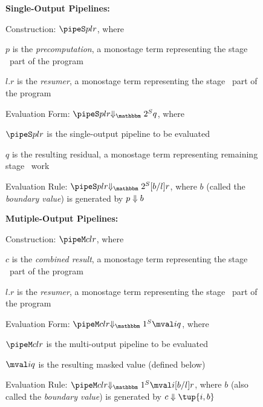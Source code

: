 \begin{figure*}
\begin{abstrsyn}

\textbf{Single-Output Pipelines:}

\hspace{2em} Construction: $\pipeS p l r$, where 
	
	\hspace{4em} $p$ is the {\em precomputation}, a monostage term representing the stage \bbone\ part of the program
	
	\hspace{4em} $l.r$ is the {\em resumer}, a monostage term representing the stage \bbtwo\ part of the program

\hspace{2em} Evaluation Form: $\sepredtwo {\pipeS p l r} q$, where 
	
	\hspace{4em} $\pipeS p l r$ is the single-output pipeline to be evaluated 
	
	\hspace{4em} $q$ is the resulting residual, a monostage term representing remaining stage \bbtwo\ work

\hspace{2em} Evaluation Rule: $\sepredtwo {\pipeS p l r} {[b/l]r}$, where $b$ (called the {\em boundary value}) is generated by ${p} \Downarrow {b}$

\textbf{Mutiple-Output Pipelines:}

\hspace{2em} Construction: $\pipeM c l r$, where 
	
	\hspace{4em} $c$ is the {\em combined result}, a monostage term representing the stage \bbone\ part of the program
	
	\hspace{4em} $l.r$ is the {\em resumer}, a monostage term representing the stage \bbtwo\ part of the program

\hspace{2em} Evaluation Form: $\sepredone {\pipeM c l r} {\mval i q}$, where 
	
	\hspace{4em} $\pipeM c l r$ is the multi-output pipeline to be evaluated
	
	\hspace{4em} $\mval i q$ is the resulting masked value (defined below)

\hspace{2em} Evaluation Rule: $\sepredone {\pipeM c l r} {\mval i {[b/l]r}}$, where $b$ (also called the {\em boundary value}) is generated by $\reduce c {\tup{i,b}}$


\end{abstrsyn}
\end{figure*}
